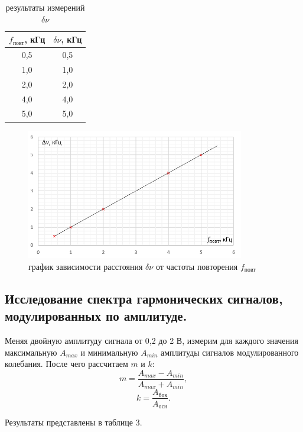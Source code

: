 \documentclass[a4paper]{article}
\theoremstyle{definition}
\theoremstyle{remark}
\begin{document}
 \begin{table}[h!]
    \centering
    \begin{tabular}{|c|c|}
    \hline
    $f_{\text{повт}}$, кГц & $\delta\nu$, кГц \\ \hline
    0,5 & 0,5                \\ \hline
    1,0 & 1,0                \\ \hline
    2,0 & 2,0                \\ \hline
    4,0 & 4,0                \\ \hline
    5,0 & 5,0                \\ \hline
    \end{tabular}
    \caption{результаты измерений $\delta\nu$}
    \end{table}


    \begin{figure}[h!]
        \centering
        \includegraphics[width = 270pt]{image/graph2.png}
        \caption{график зависимости расстояния $\delta\nu$ от частоты повторения $f_{\text{повт}}$}
    \end{figure}


\subsection{Исследование спектра гармонических сигналов, модулированных по амплитуде.}

Меняя двойную амплитуду сигнала от 0,2 до 2 В, измерим для каждого значения максимальную $A_{max}$ и минимальную $A_{min}$ амплитуды сигналов модулированного колебания. После чего рассчитаем $m$ и $k$: $$m = \frac{A_{max} - A_{min}}{A_{max}+A_{min}},$$ $$k = \frac{A_{\text{бок}}}{A_{\text{осн}}}.$$ 

\noindent Результаты представлены в таблице 3.
\end{document}
